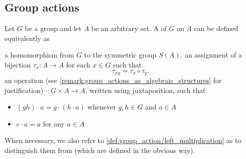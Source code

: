 \subsection{Group actions}\label{subsec:group_actions}

\begin{definition}\label{def:group_action}\cite[159]{Knapp2016BAlg}
  Let \( G \) be a group and let \( A \) be an arbitrary set. A  of \( G \) on \( A \) can be defined equivalently as
  \begin{defenum}
     a homomorphism from \( G \) to the symmetric group \( S(A) \).
     an assignment of a bijection \( \tau_x: A \to A \) for each \( x \in G \) such that
    \begin{equation*}
      \tau_{xy} = \tau_x \circ \tau_y.
    \end{equation*}
     an operation (see \cref{remark:group_actions_as_algebraic_structures} for justification) \( \cdot: G \times A \to A \), written using juxtaposition, such that
    \begin{itemize}
      \item \( (g h) \cdot a = g \cdot (h \cdot a) \) whenever \( g, h \in G \) and \( a \in A \)
      \item \( e \cdot a = a \) for any \( a \in A \)
    \end{itemize}
  \end{defenum}

  When necessary, we also refer to \ref{def:group_action/left_multiplication} as  to distinguish them from  (which are defined in the obvious way).
\end{definition}
